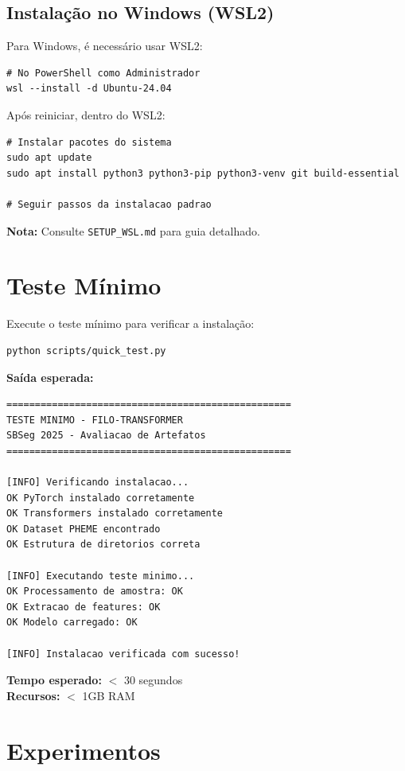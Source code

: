\documentclass[12pt]{article}
\begin{document}
\subsection{Instala\c{c}\~ao no Windows (WSL2)}

Para Windows, \'e necess\'ario usar WSL2:

\begin{verbatim}
# No PowerShell como Administrador
wsl --install -d Ubuntu-24.04
\end{verbatim}

Ap\'os reiniciar, dentro do WSL2:
\begin{verbatim}
# Instalar pacotes do sistema
sudo apt update
sudo apt install python3 python3-pip python3-venv git build-essential

# Seguir passos da instalacao padrao
\end{verbatim}

\textbf{Nota:} Consulte \texttt{SETUP\_WSL.md} para guia detalhado.

\section{Teste M\'inimo}

Execute o teste m\'inimo para verificar a instala\c{c}\~ao:

\begin{verbatim}
python scripts/quick_test.py
\end{verbatim}

\textbf{Sa\'ida esperada:}
\begin{verbatim}
==================================================
TESTE MINIMO - FILO-TRANSFORMER
SBSeg 2025 - Avaliacao de Artefatos
==================================================

[INFO] Verificando instalacao...
OK PyTorch instalado corretamente
OK Transformers instalado corretamente
OK Dataset PHEME encontrado
OK Estrutura de diretorios correta

[INFO] Executando teste minimo...
OK Processamento de amostra: OK
OK Extracao de features: OK
OK Modelo carregado: OK

[INFO] Instalacao verificada com sucesso!
\end{verbatim}

\textbf{Tempo esperado:} $<$ 30 segundos\\
\textbf{Recursos:} $<$ 1GB RAM

\section{Experimentos}
\end{document}
